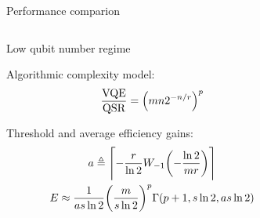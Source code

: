 \documentclass[final]{beamer}
\newlength{\onecolwid}
\newlength{\twocolwid}
\begin{document}
\begin{frame}[t]
\begin{columns}[t]
\begin{column}{\twocolwid}
\begin{alertblock}{Performance comparion}
\end{alertblock}


\begin{columns}[t,totalwidth=\twocolwid] %
\begin{column}{\onecolwid} %


\begin{block}{Low qubit number regime}

  Algorithmic complexity model:
  \begin{gather*}
    \frac{\textnormal{VQE}}{\textnormal{QSR}} = \qty(m n 2^{-n/r})^{p}
  \end{gather*}

  \vspace{1em}

  Threshold and average efficiency gains:
  \begin{gather*}
    a \defeq \ceil*{- \frac{r}{\ln{2}} W_{-1}\qty(-\frac{\ln{2}}{mr})} \\
    E \approx
      \frac{1}{as\ln{2}} \qty(\frac{m}{s\ln{2}})^p
      \Gamma \qty(p+1, s\ln{2}, as\ln{2}) \label{eq:QSR-efficiency}
  \end{gather*}

\end{block}


\end{column} %
\begin{column}{\onecolwid} %



\end{column}
\end{columns}
\end{column}
\end{columns}
\end{frame}
\end{document}
